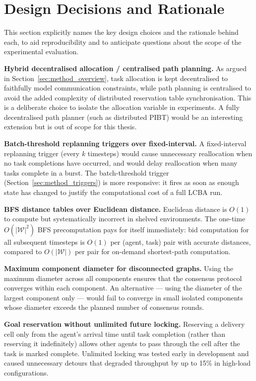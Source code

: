 \section{Design Decisions and Rationale}
\label{sec:method_design}

This section explicitly names the key design choices and the rationale behind
each, to aid reproducibility and to anticipate questions about the scope of
the experimental evaluation.

\textbf{Hybrid decentralised allocation / centralised path planning.}
As argued in Section~\ref{sec:method_overview}, task allocation is kept
decentralised to faithfully model communication constraints, while path planning
is centralised to avoid the added complexity of distributed reservation table
synchronisation.
This is a deliberate choice to isolate the allocation variable in experiments.
A fully decentralised path planner (such as distributed PIBT) would be an
interesting extension but is out of scope for this thesis.

\textbf{Batch-threshold replanning triggers over fixed-interval.}
A fixed-interval replanning trigger (every $k$ timesteps) would cause
unnecessary reallocation when no task completions have occurred, and would
delay reallocation when many tasks complete in a burst.
The batch-threshold trigger (Section~\ref{sec:method_triggers}) is more
responsive: it fires as soon as enough state has changed to justify the
computational cost of a full LCBA run.

\textbf{BFS distance tables over Euclidean distance.}
Euclidean distance is $O(1)$ to compute but systematically incorrect in
shelved environments.
The one-time $O(|\mathcal{W}|^2)$ BFS precomputation pays for itself
immediately: bid computation for all subsequent timesteps is $O(1)$
per (agent, task) pair with accurate distances, compared to $O(|\mathcal{W}|)$
per pair for on-demand shortest-path computation.

\textbf{Maximum component diameter for disconnected graphs.}
Using the maximum diameter across all components ensures that the consensus
protocol converges within each component.
An alternative --- using the diameter of the largest component only --- would
fail to converge in small isolated components whose diameter exceeds the
planned number of consensus rounds.

\textbf{Goal reservation without unlimited future locking.}
Reserving a delivery cell only from the agent's arrival time until task
completion (rather than reserving it indefinitely) allows other agents to pass
through the cell after the task is marked complete.
Unlimited locking was tested early in development and caused unnecessary
detours that degraded throughput by up to 15\% in high-load configurations.

